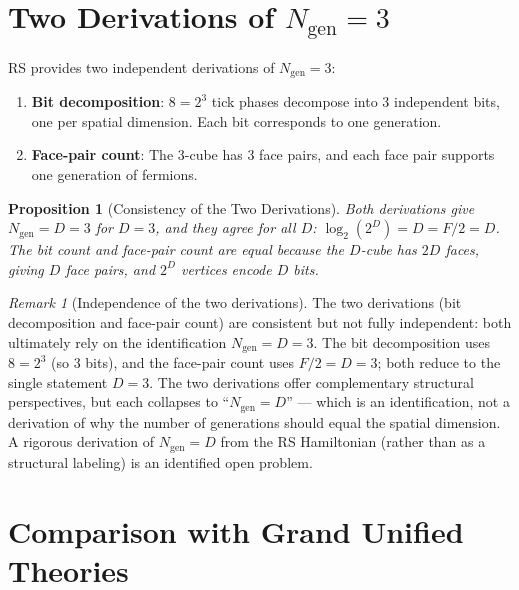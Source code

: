 \documentclass[12pt,a4paper]{article}
\newtheorem{proposition}[theorem]{Proposition}
\theoremstyle{definition}
\theoremstyle{remark}
\newtheorem{remark}[theorem]{Remark}
\begin{document}
\section{Two Derivations of $N_{\mathrm{gen}} = 3$}
\label{sec:two-derivations}

RS provides two independent derivations of
$N_{\mathrm{gen}} = 3$:

\begin{enumerate}
  \item \textbf{Bit decomposition}: $8 = 2^3$ tick phases
  decompose into 3 independent bits, one per spatial dimension.
  Each bit corresponds to one generation.

  \item \textbf{Face-pair count}: The 3-cube has 3 face pairs,
  and each face pair supports one generation of fermions.
\end{enumerate}

\begin{proposition}[Consistency of the Two Derivations]
\label{prop:consistency}
Both derivations give $N_{\mathrm{gen}} = D = 3$ for $D = 3$,
and they agree for \emph{all} $D$:
$\log_2(2^D) = D = F/2 = D$.  The bit count and face-pair
count are equal because the $D$-cube has $2D$ faces, giving
$D$ face pairs, and $2^D$ vertices encode $D$ bits.
\end{proposition}

\begin{remark}[Independence of the two derivations]
\label{rem:independence}
The two derivations (bit decomposition and face-pair count) are
consistent but not fully independent: both ultimately rely on the
identification $N_\mathrm{gen} = D = 3$.  The bit decomposition
uses $8 = 2^3$ (so 3 bits), and the face-pair count uses $F/2 = D = 3$;
both reduce to the single statement $D = 3$.  The two derivations offer
complementary structural perspectives, but each collapses to
``$N_\mathrm{gen} = D$'' --- which is an identification, not a derivation
of why the number of generations should equal the spatial dimension.  A
rigorous derivation of $N_\mathrm{gen} = D$ from the RS Hamiltonian
(rather than as a structural labeling) is an identified open problem.
\end{remark}

\section{Comparison with Grand Unified Theories}
\label{sec:gut}
\end{document}
